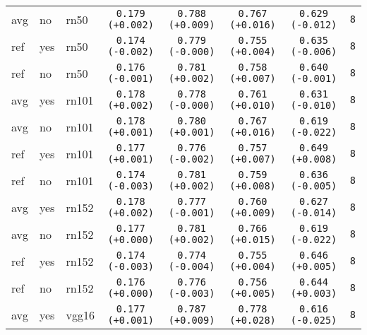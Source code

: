 \begin{tabular}{|l|l|l|c|c|c|c|c|}
avg & no & rn50 & \texttt{0.179 {\color{green}(+0.002)}} & \texttt{0.788 {\color{red}(+0.009)}} & \texttt{0.767 {\color{red}(+0.016)}} & \texttt{0.629 {\color{red}(-0.012)}} & \texttt{8} \\
ref & yes & rn50 & \texttt{0.174 {\color{red}(-0.002)}} & \texttt{0.779 {\color{black}(-0.000)}} & \texttt{0.755 {\color{red}(+0.004)}} & \texttt{0.635 {\color{red}(-0.006)}} & \texttt{8} \\
ref & no & rn50 & \texttt{0.176 {\color{red}(-0.001)}} & \texttt{0.781 {\color{red}(+0.002)}} & \texttt{0.758 {\color{red}(+0.007)}} & \texttt{0.640 {\color{red}(-0.001)}} & \texttt{8} \\
\hline
avg & yes & rn101 & \texttt{0.178 {\color{green}(+0.002)}} & \texttt{0.778 {\color{black}(-0.000)}} & \texttt{0.761 {\color{red}(+0.010)}} & \texttt{0.631 {\color{red}(-0.010)}} & \texttt{8} \\
avg & no & rn101 & \texttt{0.178 {\color{green}(+0.001)}} & \texttt{0.780 {\color{red}(+0.001)}} & \texttt{0.767 {\color{red}(+0.016)}} & \texttt{0.619 {\color{red}(-0.022)}} & \texttt{8} \\
ref & yes & rn101 & \texttt{0.177 {\color{green}(+0.001)}} & \texttt{0.776 {\color{green}(-0.002)}} & \texttt{0.757 {\color{red}(+0.007)}} & \texttt{0.649 {\color{green}(+0.008)}} & \texttt{8} \\
ref & no & rn101 & \texttt{0.174 {\color{red}(-0.003)}} & \texttt{0.781 {\color{red}(+0.002)}} & \texttt{0.759 {\color{red}(+0.008)}} & \texttt{0.636 {\color{red}(-0.005)}} & \texttt{8} \\
\hline
avg & yes & rn152 & \texttt{0.178 {\color{green}(+0.002)}} & \texttt{0.777 {\color{green}(-0.001)}} & \texttt{0.760 {\color{red}(+0.009)}} & \texttt{0.627 {\color{red}(-0.014)}} & \texttt{8} \\
avg & no & rn152 & \texttt{0.177 {\color{black}(+0.000)}} & \texttt{0.781 {\color{red}(+0.002)}} & \texttt{0.766 {\color{red}(+0.015)}} & \texttt{0.619 {\color{red}(-0.022)}} & \texttt{8} \\
ref & yes & rn152 & \texttt{0.174 {\color{red}(-0.003)}} & \texttt{0.774 {\color{green}(-0.004)}} & \texttt{0.755 {\color{red}(+0.004)}} & \texttt{0.646 {\color{green}(+0.005)}} & \texttt{8} \\
ref & no & rn152 & \texttt{0.176 {\color{black}(+0.000)}} & \texttt{0.776 {\color{green}(-0.003)}} & \texttt{0.756 {\color{red}(+0.005)}} & \texttt{0.644 {\color{green}(+0.003)}} & \texttt{8} \\
\hline
avg & yes & vgg16 & \texttt{0.177 {\color{green}(+0.001)}} & \texttt{0.787 {\color{red}(+0.009)}} & \texttt{0.778 {\color{red}(+0.028)}} & \texttt{0.616 {\color{red}(-0.025)}} & \texttt{8} \\

\end{tabular}
